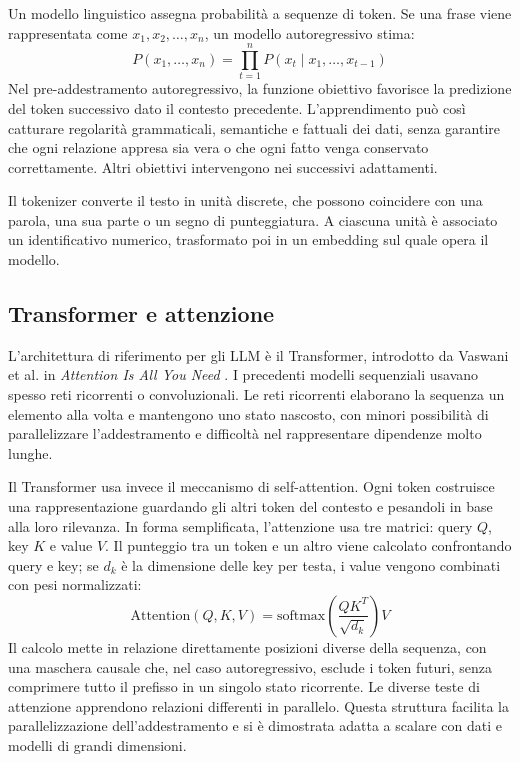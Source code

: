 Un modello linguistico assegna probabilità a sequenze di token. Se una frase viene rappresentata come $x_1, x_2, \ldots, x_n$, un modello autoregressivo stima:
\[
    P(x_1, \ldots, x_n) = \prod_{t=1}^{n} P(x_t \mid x_1, \ldots, x_{t-1})
\]
Nel pre-addestramento autoregressivo, la funzione obiettivo favorisce la
predizione del token successivo dato il contesto precedente. L'apprendimento
può così catturare regolarità grammaticali, semantiche e fattuali dei dati,
senza garantire che ogni relazione appresa sia vera o che ogni fatto venga
conservato correttamente. Altri obiettivi intervengono nei successivi adattamenti.

Il tokenizer converte il testo in unità discrete, che possono coincidere con una
parola, una sua parte o un segno di punteggiatura. A ciascuna unità è associato
un identificativo numerico, trasformato poi in un embedding sul quale opera il
modello.

\subsection{Transformer e attenzione}

L'architettura di riferimento per gli LLM è il Transformer, introdotto da Vaswani
et al. in \emph{Attention Is All You Need} \cite{vaswaniAttention}. I precedenti
modelli sequenziali usavano spesso reti ricorrenti o convoluzionali. Le reti
ricorrenti elaborano la sequenza un elemento alla volta e mantengono uno stato
nascosto, con minori possibilità di parallelizzare l'addestramento e difficoltà
nel rappresentare dipendenze molto lunghe.

Il Transformer usa invece il meccanismo di self-attention. Ogni token costruisce una rappresentazione guardando gli altri token del contesto e pesandoli in base alla loro rilevanza. In forma semplificata, l'attenzione usa tre matrici: query $Q$, key $K$ e value $V$. Il punteggio tra un token e un altro viene calcolato confrontando query e key;
se $d_k$ è la dimensione delle key per testa, i value vengono combinati con
pesi normalizzati:
\[
    \mathrm{Attention}(Q,K,V) = \mathrm{softmax}\left(\frac{QK^T}{\sqrt{d_k}}\right)V
\]
Il calcolo mette in relazione direttamente posizioni diverse della sequenza,
con una maschera causale che, nel caso autoregressivo, esclude i token futuri,
senza comprimere tutto il prefisso in un singolo stato ricorrente. Le diverse
teste di attenzione apprendono relazioni differenti in parallelo. Questa
struttura facilita la parallelizzazione dell'addestramento e si è dimostrata
adatta a scalare con dati e modelli di grandi dimensioni.

